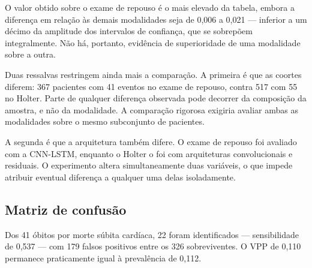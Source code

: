 O valor obtido sobre o exame de repouso é o mais elevado da tabela, embora a
diferença em relação às demais modalidades seja de 0,006 a 0,021 --- inferior
a um décimo da amplitude dos intervalos de confiança, que se sobrepõem
integralmente. Não há, portanto, evidência de superioridade de uma
modalidade sobre a outra.

Duas ressalvas restringem ainda mais a comparação. A primeira é que as
coortes diferem: 367 pacientes com 41 eventos no exame de repouso, contra 517
com 55 no Holter. Parte de qualquer diferença observada pode decorrer da
composição da amostra, e não da modalidade. A comparação rigorosa exigiria
avaliar ambas as modalidades sobre o mesmo subconjunto de pacientes.

A segunda é que a arquitetura também difere. O exame de repouso foi avaliado
com a CNN-LSTM, enquanto o Holter o foi com arquiteturas convolucionais e
residuais. O experimento altera simultaneamente duas variáveis, o que impede
atribuir eventual diferença a qualquer uma delas isoladamente.

\subsection{Matriz de confusão}
\label{subsec:cnnlstm-confusao}

\begin{table}[h!]
	\captionsetup{width=11cm}
\end{table}

Dos 41 óbitos por morte súbita cardíaca, 22 foram identificados ---
sensibilidade de 0,537 --- com 179 falsos positivos entre os 326
sobreviventes. O \gls{VPP} de 0,110 permanece praticamente igual à
prevalência de 0,112.

